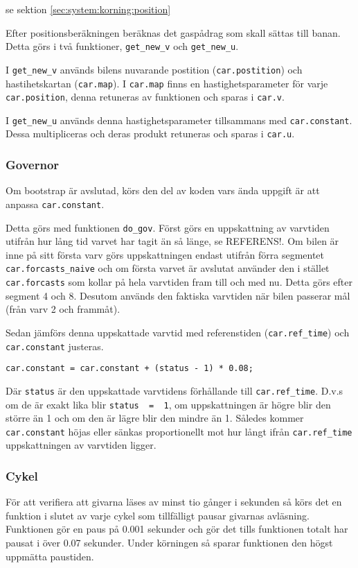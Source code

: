se sektion \ref{sec:system:korning:position}

Efter positionsberäkningen beräknas det gaspådrag som skall sättas till banan. Detta görs i två
funktioner, \texttt{get\_new\_v} och \texttt{get\_new\_u}.
 
I \texttt{get\_new\_v} används bilens nuvarande postition (\texttt{car.postition})
och hastihetskartan (\texttt{car.map}). I \texttt{car.map} finns en
hastighetsparameter för varje \texttt{car.position}, denna retuneras av funktionen
och sparas i \texttt{car.v}.
 
I \texttt{get\_new\_u} används denna hastighetsparameter tillsammans med
\texttt{car.constant}. Dessa multipliceras och deras produkt retuneras och sparas
i \texttt{car.u}.

\subsubsection{Governor}

Om bootstrap är avslutad, körs den del av koden vars ända uppgift är att 
anpassa \texttt{car.constant}. 

Detta görs med funktionen \texttt{do\_gov}.  Först görs en uppskattning av 
varvtiden utifrån hur lång tid varvet har tagit än
så länge, se REFERENS!. Om bilen är inne på sitt första varv görs uppskattningen endast
utifrån förra segmentet \texttt{car.forcasts\_naive} och om första varvet är
avslutat använder den i stället \texttt{car.forcasts} som kollar på hela varvtiden
fram till och med nu. Detta görs efter segment 4 och 8. Desutom används den
faktiska varvtiden när bilen passerar mål (från varv 2 och frammåt).
 
Sedan jämförs denna uppskattade varvtid med referenstiden (\texttt{car.ref\_time}) 
och \texttt{car.constant} justeras.
\begin{verbatim}
car.constant = car.constant + (status - 1) * 0.08;
\end{verbatim}
Där \texttt{status} är den uppskattade varvtidens förhållande till \texttt{car.ref\_time}.
D.v.s om de är exakt lika blir \texttt{status~ =~ 1}, om uppskattningen är högre blir
den större än 1 och om den är lägre blir den mindre än 1. Således kommer \texttt{car.constant}
höjas eller sänkas proportionellt mot hur långt ifrån \texttt{car.ref\_time} uppskattningen
av varvtiden ligger. 

\subsubsection{Cykel}
För att verifiera att givarna läses av minst tio gånger i sekunden så körs det
en funktion i slutet av varje cykel som tillfälligt pausar givarnas avläsning.
Funktionen gör en paus på 0.001 sekunder och gör det tills funktionen totalt har
pausat i över 0.07 sekunder. Under körningen så sparar funktionen den högst
uppmätta paustiden.